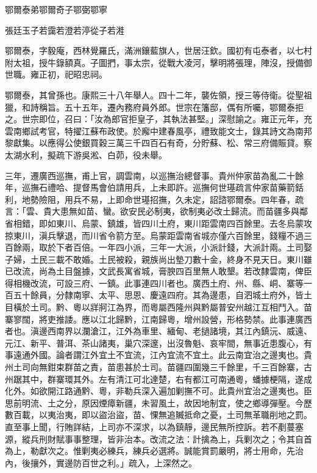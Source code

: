 
\begin{pinyinscope}
鄂爾泰弟鄂爾奇子鄂弼鄂寧

張廷玉子若靄若澄若渟從子若溎

鄂爾泰，字毅庵，西林覺羅氏，滿洲鑲藍旗人，世居汪欽。國初有屯泰者，以七村附太祖，授牛錄額真。子圖捫，事太宗，從戰大凌河，擊明將張理，陣沒，授備御世職。雍正初，祀昭忠祠。

鄂爾泰，其曾孫也。康熙三十八年舉人。四十二年，襲佐領，授三等侍衛。從聖祖獵，和詩稱旨。五十五年，遷內務府員外郎。世宗在籓邸，偶有所囑，鄂爾泰拒之。世宗即位，召曰：「汝為郎官拒皇子，其執法甚堅。」深慰諭之。雍正元年，充雲南鄉試考官，特擢江蘇布政使。於廨中建春風亭，禮致能文士，錄其詩文為南邦黎獻集。以應得公使銀買穀三萬三千四百石有奇，分貯蘇、松、常三府備賑貸。察太湖水利，擬疏下游吳淞、白茆，役未舉。

三年，遷廣西巡撫，甫上官，調雲南，以巡撫治總督事。貴州仲家苗為亂二十餘年，巡撫石禮哈、提督馬會伯請用兵，上未即許。巡撫何世璂疏言仲家苗藥箭銛利，地勢險阻，用兵不易，上即命世璂招撫，久未定，詔諮鄂爾泰。四年春，疏言：「雲、貴大患無如苗、蠻。欲安民必制夷，欲制夷必改土歸流。而苗疆多與鄰省相錯，即如東川、烏蒙、鎮雄，皆四川土府，東川距雲南四百餘里。去冬烏蒙攻掠東川，滇兵擊退，而川省令箭方至。烏蒙距雲南省城亦僅六百餘里，錢糧不過三百餘兩，取於下者百倍。一年四小派，三年一大派，小派計錢，大派計兩。土司娶子婦，土民三載不敢婚。土民被殺，親族尚出墊刀數十金，終身不見天日。東川雖已改流，尚為土目盤據，文武長寓省城，膏腴四百里無人敢墾。若改隸雲南，俾臣得相機改流，可設三府、一鎮。此事連四川者也。廣西土府、州、縣、峒、寨等一百五十餘員，分隸南寧、太平、思恩、慶遠四府。其為邊患，自泗城土府外，皆土目橫於土司。黔、粵以牂牁江為界，而粵屬西隆州與黔屬普安州越江互相鬥入。苗寨寥闊，將吏推諉。應以江北歸黔，江南歸粵，增州設營，形格勢禁。此事連廣西者也。滇邊西南界以瀾滄江，江外為車里、緬甸、老撾諸境，其江內鎮沅、威遠、元江、新平、普洱、茶山諸夷，巢穴深邃，出沒魯魁、哀牢間，無事近患腹心，有事遠通外國。論者謂江外宜土不宜流，江內宜流不宜土。此云南宜治之邊夷也。貴州土司向無鉗束群苗之責，苗患甚於土司。苗疆四圍幾三千餘里，千三百餘寨，古州踞其中，群寨環其外。左有清江可北達楚，右有都江可南通粵，蟠據梗隔，遂成化外。如欲開江路通黔、粵，非勒兵深入遍加剿撫不可。此貴州宜治之邊夷也。臣思前明流、土之分，原因煙瘴新疆，未習風土，故因地制宜，使之鄉導彈壓。今歷數百載，以夷治夷，即以盜治盜，苗、惈無追贓抵命之憂，土司無革職削地之罰。直至事上聞，行賄詳結，上司亦不深求，以為鎮靜，邊民無所控訴。若不剷蔓塞源，縱兵刑財賦事事整理，皆非治本。改流之法：計擒為上，兵剿次之；令其自首為上，勒獻次之。惟剿夷必練兵，練兵必選將。誠能賞罰嚴明，將士用命，先治內，後攘外，實邊防百世之利。」疏入，上深然之。


\end{pinyinscope}
